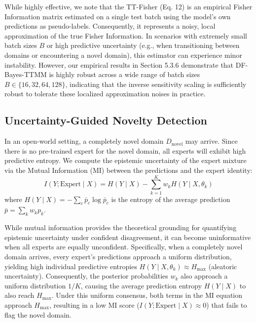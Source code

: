 \documentclass{article}
\theoremstyle{plain}
\theoremstyle{definition}
\theoremstyle{remark}
\begin{document}
While highly effective, we note that the TT-Fisher (Eq. 12) is an empirical Fisher Information
matrix estimated on a single test batch using the model's own predictions as pseudo-labels.
Consequently, it represents a noisy, local approximation of the true Fisher Information. In
scenarios with extremely small batch sizes $B$ or high predictive uncertainty (e.g., when
transitioning between domains or encountering a novel domain), this estimator can experience minor
instability. However, our empirical results in Section 5.3.6 demonstrate that DF-Bayes-TTMM is
highly robust across a wide range of batch sizes $B \in \{16, 32, 64, 128\}$, indicating that the
inverse sensitivity scaling is sufficiently robust to tolerate these localized approximation noises
in practice.

\subsection{Uncertainty-Guided Novelty Detection}\vspace{-0.1in}
In an open-world setting, a completely novel domain $D_{\text{novel}}$ may arrive. Since there is
no pre-trained expert for the novel domain, all experts will exhibit high predictive entropy. We
compute the epistemic uncertainty of the expert mixture via the Mutual Information (MI) between the
predictions and the expert identity:
\begin{equation}
    I(Y; \text{Expert} \mid X) = H(Y \mid X) - \sum_{k=1}^K w_k H(Y \mid X, \theta_k)
\end{equation}
where $H(Y \mid X) = -\sum_{c} \bar{p}_c \log \bar{p}_c$ is the entropy of the average prediction
$\bar{p} = \sum_k w_k p_k$.

While mutual information provides the theoretical grounding for quantifying epistemic uncertainty
under confident disagreement, it can become uninformative when all experts are equally unconfident.
Specifically, when a completely novel domain arrives, every expert's predictions approach a uniform
distribution, yielding high individual predictive entropies $H(Y \mid X, \theta_k) \approx H_{\max}$
(aleatoric uncertainty). Consequently, the posterior probabilities $w_k$ also approach a uniform
distribution $1/K$, causing the average prediction entropy $H(Y \mid X)$ to also reach $H_{\max}$.
Under this uniform consensus, both terms in the MI equation approach $H_{\max}$, resulting in a low
MI score ($I(Y; \text{Expert} \mid X) \approx 0$) that fails to flag the novel domain.
\end{document}
